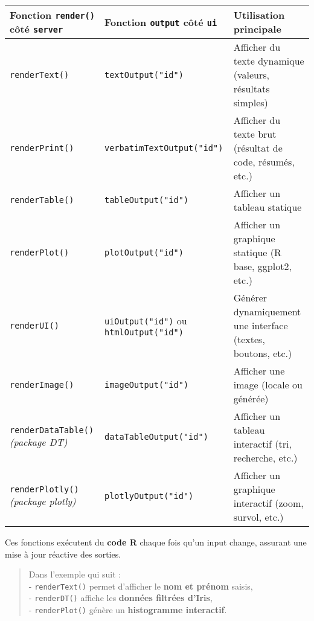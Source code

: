 \documentclass[
]{article}
\begin{document}
\begin{longtable}[]{@{}
  >{\raggedright\arraybackslash}p{}
  >{\raggedright\arraybackslash}p{}
  >{\raggedright\arraybackslash}p{}@{}}
\toprule\noalign{}
\begin{minipage}[b]{\linewidth}\raggedright
Fonction \texttt{render()} côté \texttt{server}
\end{minipage} & \begin{minipage}[b]{\linewidth}\raggedright
Fonction \texttt{output} côté \texttt{ui}
\end{minipage} & \begin{minipage}[b]{\linewidth}\raggedright
Utilisation principale
\end{minipage} \\
\midrule\noalign{}
\endhead
\bottomrule\noalign{}
\endlastfoot
\texttt{renderText()} & \texttt{textOutput("id")} & Afficher du texte
dynamique (valeurs, résultats simples) \\
\texttt{renderPrint()} & \texttt{verbatimTextOutput("id")} & Afficher du
texte brut (résultat de code, résumés, etc.) \\
\texttt{renderTable()} & \texttt{tableOutput("id")} & Afficher un
tableau statique \\
\texttt{renderPlot()} & \texttt{plotOutput("id")} & Afficher un
graphique statique (R base, ggplot2, etc.) \\
\texttt{renderUI()} & \texttt{uiOutput("id")} ou
\texttt{htmlOutput("id")} & Générer dynamiquement une interface (textes,
boutons, etc.) \\
\texttt{renderImage()} & \texttt{imageOutput("id")} & Afficher une image
(locale ou générée) \\
\texttt{renderDataTable()} \emph{(package DT)} &
\texttt{dataTableOutput("id")} & Afficher un tableau interactif (tri,
recherche, etc.) \\
\texttt{renderPlotly()} \emph{(package plotly)} &
\texttt{plotlyOutput("id")} & Afficher un graphique interactif (zoom,
survol, etc.) \\
\end{longtable}

Ces fonctions exécutent du \textbf{code R} chaque fois qu'un input
change, assurant une mise à jour réactive des sorties.

\begin{quote}
Dans l'exemple qui suit :\\
- \texttt{renderText()} permet d'afficher le \textbf{nom et prénom}
saisis,\\
- \texttt{renderDT()} affiche les \textbf{données filtrées d'Iris},\\
- \texttt{renderPlot()} génère un \textbf{histogramme interactif}.
\end{quote}
\end{document}
